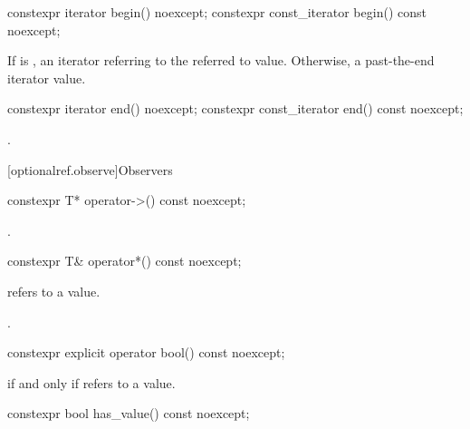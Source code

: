 \begin{addedblock}
\begin{itemdecl}
constexpr iterator begin() noexcept;
constexpr const_iterator begin() const noexcept;
\end{itemdecl}

\begin{itemdescr}
  \pnum
  \returns
  If  is ,
  an iterator referring to the referred to value.
  Otherwise, a past-the-end iterator value.

\end{itemdescr}

\begin{itemdecl}
constexpr iterator end() noexcept;
constexpr const_iterator end() const noexcept;
\end{itemdecl}

\begin{itemdescr}
\pnum
\returns
{}.
\end{itemdescr}



[optionalref.observe]{Observers}

\begin{itemdecl}
constexpr T* operator->() const noexcept;
\end{itemdecl}

\begin{itemdescr}
  \pnum
  \returns
  .

\end{itemdescr}

\begin{itemdecl}
constexpr T& operator*() const noexcept;
\end{itemdecl}

\begin{itemdescr}
   \pnum
   \expects
    refers to a value.

   \pnum
   \returns
   .

\end{itemdescr}

\begin{itemdecl}
constexpr explicit operator bool() const noexcept;
\end{itemdecl}

\begin{itemdescr}
  \pnum
  \returns
   if and only if  refers to a value.
\end{itemdescr}

\begin{itemdecl}
constexpr bool has_value() const noexcept;
\end{itemdecl}


\end{addedblock}

